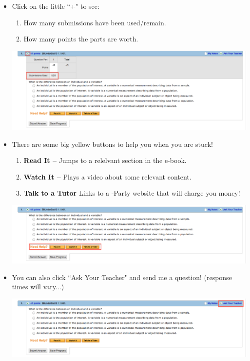 \documentclass{article}
\begin{document}
\begin{itemize}

\item Click on the little ``+" to see: \begin{enumerate} \item How many submissions have been used/remain. \item How many points the parts are worth. \end{enumerate}

\begin{center}
\includegraphics[scale=0.25]{problemplus.png}
\end{center}

\item There are some big yellow buttons to help you when you are stuck!
\begin{enumerate}
\item \textbf{Read It --} Jumps to a relelvant section in the e-book.
\item \textbf{Watch It --} Plays a video about some relevant content.
\item \textbf{Talk to a Tutor} Links to a -Party website that will charge you money!
\end{enumerate}

\begin{center}
\includegraphics[scale=0.25]{problem-buttons.png}
\end{center}

\item You can also click ``Ask Your Teacher" and send me a question! (response times will vary...)

\begin{center}
\includegraphics[scale=0.25]{problem-teacher.png}
\end{center}


\end{itemize}
\end{document}
